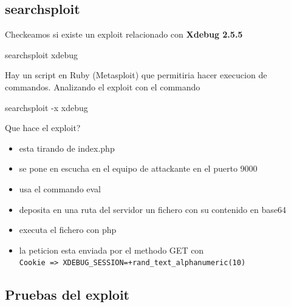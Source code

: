 \documentclass{assets/ipesethesis}
\newenvironment{Shaded}{\begin{snugshade}}{\end{snugshade}}
\newcommand{\ExtensionTok}[1]{#1}
\newcommand{\NormalTok}[1]{#1}
\providecommand{\tightlist}{%
  \setlength{\itemsep}{0pt}\setlength{\parskip}{0pt}}
\begin{document}
\hypertarget{searchsploit}{%
\subsection*{searchsploit}\label{searchsploit}}

Checkeamos si existe un exploit relacionado con \textbf{Xdebug 2.5.5}

\begin{Shaded}
\begin{Highlighting}[]
\ExtensionTok{searchsploit}\NormalTok{ xdebug}
\end{Highlighting}
\end{Shaded}

Hay un script en Ruby (Metasploit) que permitiria hacer execucion de commandos. Analizando el exploit con el commando

\begin{Shaded}
\begin{Highlighting}[]
\ExtensionTok{searchsploit}\NormalTok{ -x xdebug}
\end{Highlighting}
\end{Shaded}

Que hace el exploit?

\begin{itemize}
\tightlist
\item
  esta tirando de index.php
\item
  se pone en escucha en el equipo de attackante en el puerto 9000
\item
  usa el commando eval
\item
  deposita en una ruta del servidor un fichero con su contenido en base64
\item
  executa el fichero con php
\item
  la peticion esta enviada por el methodo GET con \texttt{\textquotesingle{}Cookie\textquotesingle{}\ =\textgreater{}\ \textquotesingle{}XDEBUG\_SESSION=+rand\_text\_alphanumeric(10)\textquotesingle{}}
\end{itemize}

\hypertarget{pruebas-del-exploit}{%
\subsection*{Pruebas del exploit}\label{pruebas-del-exploit}}
\end{document}
